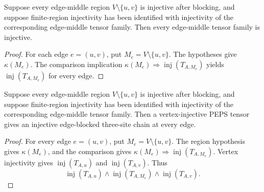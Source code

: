 \begin{theorem}%
    \label{thm:peps_edgeMiddleTensorInjective_all_of_region}
    \leanok
    Suppose every edge-middle region $V\setminus\{u,v\}$ is injective after
    blocking, and suppose finite-region injectivity has been identified with
    injectivity of the corresponding edge-middle tensor family. Then every
    edge-middle tensor family is injective.
\end{theorem}
\begin{proof}\leanok
    For each edge $e=(u,v)$, put $M_e=V\setminus\{u,v\}$. The hypotheses give
    $\kappa(M_e)$. The comparison implication
    $\kappa(M_e)\Longrightarrow\operatorname{inj}(T_{A,M_e})$ yields
    $\operatorname{inj}(T_{A,M_e})$ for every edge.
\end{proof}

\begin{theorem}%
    \label{thm:peps_edgeBlockedThreeSiteInjective_all_of_region}
    \leanok
    Suppose every edge-middle region $V\setminus\{u,v\}$ is injective after
    blocking, and suppose finite-region injectivity has been identified with
    injectivity of the corresponding edge-middle tensor family. Then a
    vertex-injective PEPS tensor gives an injective edge-blocked three-site
    chain at every edge.
\end{theorem}
\begin{proof}\leanok
    For every edge $e=(u,v)$, put $M_e=V\setminus\{u,v\}$. The region
    hypothesis gives $\kappa(M_e)$, and the comparison gives
    $\kappa(M_e)\Longrightarrow\operatorname{inj}(T_{A,M_e})$. Vertex
    injectivity gives $\operatorname{inj}(T_{A,u})$ and
    $\operatorname{inj}(T_{A,v})$. Thus
    \[
        \operatorname{inj}(T_{A,u})\wedge
        \operatorname{inj}(T_{A,M_e})\wedge
        \operatorname{inj}(T_{A,v}).
    \]
\end{proof}

